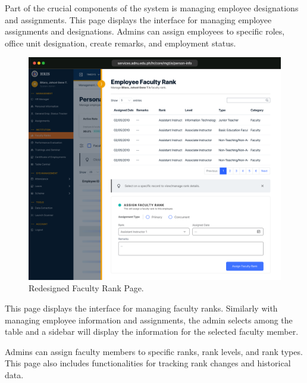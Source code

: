     Part of the crucial components of the system is managing employee designations and assignments. This page displays the interface for managing employee assignments and designations. Admins can assign employees to specific roles, office unit designation, create remarks, and employment status.

    \begin{figure}[H]
        \centering
        \includegraphics[width=1\linewidth]{figures/app/ranks.png}
        \caption{Redesigned Faculty Rank Page.}
        \label{fig:app-fac-rank}
    \end{figure}

    This page displays the interface for managing faculty ranks. Similarly with managing employee information and assignments, the admin selects among the table and a sidebar will display the information for the selected faculty member.
    
    Admins can assign faculty members to specific ranks, rank levels, and rank types. This page also includes functionalities for tracking rank changes and historical data.


